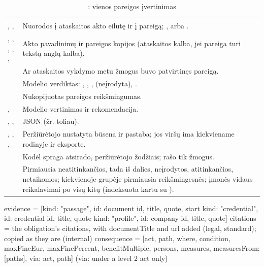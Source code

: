 \begin{xltabular}{\textwidth}{@{}L{38mm}Y@{}}
\caption{: vienos pareigos įvertinimas}\label{tab:data:rf}\\
\toprule
{} &  \\
\midrule
\endfirsthead
\toprule
{} &  \\
\midrule
\endhead
\bottomrule
\endlastfoot
{}, ,  & Nuorodos į ataskaitos akto eilutę ir į pareigą; ,  arba . \\
, , , , ,  & Akto pavadinimų ir pareigos kopijos (ataskaitos kalba, jei pareiga turi tekstą anglų kalba). \\
 & Ar ataskaitos vykdymo metu žmogus buvo patvirtinęs pareigą. \\
 & Modelio verdiktas: , , ,  (neįrodyta), . \\
 & Nukopijuotas pareigos reikšmingumas. \\
,  & Modelio vertinimas ir rekomendacija. \\
, ,  & JSON (žr. toliau). \\
, , ,  & Peržiūrėtojo nustatyta būsena ir pastaba; jos viršų ima kiekviename rodinyje ir eksporte. \\
 & Kodėl spraga atsirado, peržiūrėtojo žodžiais; rašo tik žmogus. \\
 & Pirmiausia neatitinkančios, tada iš dalies, neįrodytos, atitinkančios, netaikomos; kiekvienoje grupėje pirmiausia reikšmingesnės; įmonės vidaus reikalavimai po visų kitų (indeksuota kartu su ). \\
\end{xltabular}

\begin{codeblock}
evidence    = [{kind: "passage",    id: document id,   title, quote, start}
               {kind: "credential", id: credential id, title, quote}
               {kind: "profile",    id: company id,    title, quote}]
citations   = the obligation's citations, with documentTitle and url added
              (legal, standard); copied as they are (internal)
consequence = [{act, path, where, condition, maxFineEur, maxFinePercent,
                benefitMultiple, persons, measures, measuresFrom: [paths],
                via: {act, path}}]      (via: under a level 2 act only)
\end{codeblock}

